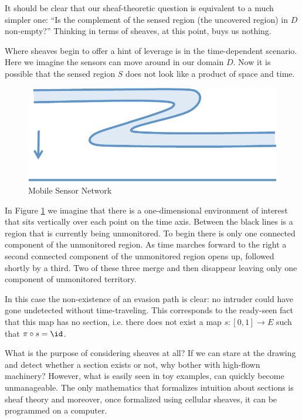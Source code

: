 It should be clear that our sheaf-theoretic question is equivalent to a much simpler one: ``Is the complement of the sensed region (the uncovered region) in $D$ non-empty?'' Thinking in terms of sheaves, at this point, buys us nothing. 

Where sheaves begin to offer a hint of leverage is in the time-dependent scenario. Here we imagine the sensors can move around in our domain $D$. Now it is possible that the sensed region $S$ does not look like a product of space and time.
 
\begin{figure}
\begin{center}
\includegraphics[width=.7\textwidth]{evade_sketch.pdf}
\caption{Mobile Sensor Network}
\label{fig:mobile_s}
\end{center}
\end{figure}

\begin{ex}
In Figure \ref{fig:mobile_s} we imagine that there is a one-dimensional environment of interest that sits vertically over each point on the time axis. Between the black lines is a region that is currently being unmonitored. To begin there is only one connected component of the unmonitored region. As time marches forward to the right a second connected component of the unmonitored region opens up, followed shortly by a third. Two of these three merge and then disappear leaving only one component of unmonitored territory.

In this case the non-existence of an evasion path is clear: no intruder could have gone undetected without time-traveling. This corresponds to the ready-seen fact that this map has no section, i.e. there does not exist a map $s:[0,1]\to E$ such that $\pi\circ s=\id$.
\end{ex}

What is the purpose of considering sheaves at all? If we can stare at the drawing and detect whether a section exists or not, why bother with high-flown machinery? However, what is easily seen in toy examples, can quickly become unmanageable. The only mathematics that formalizes intuition about sections is sheaf theory and moreover, once formalized using cellular sheaves, it can be programmed on a computer. 

